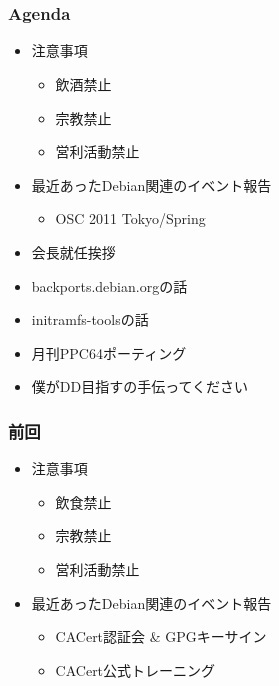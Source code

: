 \frame{\titlepage{}}

\section{}
\begin{frame}
 \frametitle{Agenda}
\begin{minipage}[t]{0.45\hsize}
  \begin{itemize}
  \item 注意事項
	\begin{itemize}
	 \item 飲酒禁止
	 \item 宗教禁止
	 \item 営利活動禁止
	\end{itemize}
   \item 最近あったDebian関連のイベント報告
	\begin{itemize}
	 \item OSC 2011 Tokyo/Spring
	\end{itemize}
 \end{itemize}
\end{minipage} 
\begin{minipage}[t]{0.45\hsize}
 \begin{itemize}
  \item 会長就任挨拶
  \item backports.debian.orgの話
  \item initramfs-toolsの話
  \item 月刊PPC64ポーティング
  \item 僕がDD目指すの手伝ってください
 \end{itemize}
\end{minipage}
\end{frame}

\begin{frame}
 \frametitle{前回}
\begin{minipage}[t]{0.45\hsize}
  \begin{itemize}
  \item 注意事項
	\begin{itemize}
	 \item 飲食禁止
	 \item 宗教禁止
	 \item 営利活動禁止
	\end{itemize}
  \end{itemize}
\end{minipage}
\begin{minipage}[t]{0.45\hsize}
\begin{itemize}
  \item 最近あったDebian関連のイベント報告
	\begin{itemize}
	 \item CACert認証会 \& GPGキーサイン
	 \item CACert公式トレーニング
	\end{itemize}
 \end{itemize}
\end{minipage}
\end{frame}



